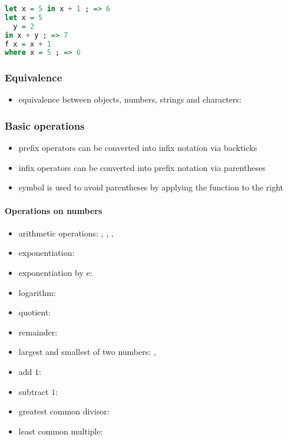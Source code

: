 \documentclass[a4paper,landscape,10pt]{article}
\begin{document}
\begin{multicols*}{2}
  \begin{lstlisting}[language=Haskell]
let x = 5 in x + 1 ; => 6
let x = 5
  y = 2
in x + y ; => 7
f x = x + 1
where x = 5 ; => 6
\end{lstlisting}

  \subsubsection{Equivalence}

  \begin{itemize}
    \item equivalence between objects, numbers, strings and characters: \ihaskell{==}
  \end{itemize}

  \subsubsection{Basic operations}

  \begin{itemize}
    \item prefix operators can be converted into infix notation via backticks 
    \item infix operators can be converted into prefix notation via parentheses 
    \item symbol \ihaskell{\$} is used to avoid parentheses by applying the function to the right %
  \end{itemize}

  \paragraph{Operations on numbers}

  \begin{itemize}
    \item arithmetic operations: \ihaskell{+}, \ihaskell{-}, \ihaskell{*}, \ihaskell{/}
    \item exponentiation: \ihaskell{**}
    \item exponentiation by e: 
    \item logarithm: 
    \item quotient: 
    \item remainder: 
    \item largest and smallest of two numbers: , 
    \item add \(1\): 
    \item subtract \(1\): 
    \item greatest common divisor: 
    \item least common multiple: 
  \end{itemize}


\end{multicols*}
\end{document}
